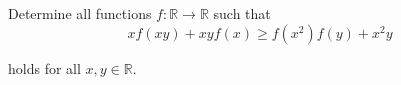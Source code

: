 Determine all functions $f : \mathbb{R} \to \mathbb{R}$ such that\[ xf(xy) + xyf(x) \ge f(x^2)f(y) + x^2y \]

holds for all $x,y \in \mathbb{R}$.